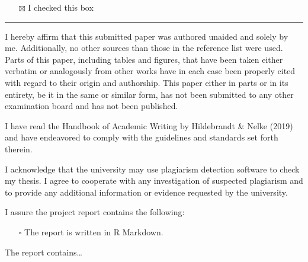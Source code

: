 \documentclass[
  12pt,
]{article}
\providecommand{\tightlist}{%
  \setlength{\itemsep}{0pt}\setlength{\parskip}{0pt}}
\begin{document}
\begin{itemize}
\tightlist
\item[$\boxtimes$]
  I checked this box
\end{itemize}

\begin{center}\rule{0.5\linewidth}{0.5pt}\end{center}

I hereby affirm that this submitted paper was authored unaided and
solely by me. Additionally, no other sources than those in the reference
list were used. Parts of this paper, including tables and figures, that
have been taken either verbatim or analogously from other works have in
each case been properly cited with regard to their origin and
authorship. This paper either in parts or in its entirety, be it in the
same or similar form, has not been submitted to any other examination
board and has not been published.

I have read the Handbook of Academic Writing by Hildebrandt \& Nelke (2019) and
have endeavored to comply with the guidelines and standards set forth
therein.

I acknowledge that the university may use plagiarism detection software
to check my thesis. I agree to cooperate with any investigation of
suspected plagiarism and to provide any additional information or
evidence requested by the university.

I assure the project report contains the following:

\begin{itemize}
\tightlist
\item[$\square$]
  The report is written in R Markdown.
\end{itemize}

The report contains\ldots{}
\end{document}
